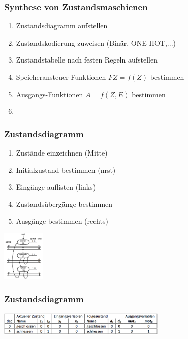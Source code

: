 \subsubsection{Synthese von Zustandsmaschienen}
	\begin{multicols}{2}
		\begin{enumerate}
			\item Zustandsdiagramm aufstellen
			\item Zustandskodierung zuweisen (Binär, ONE-HOT,...)
			\item Zustandstabelle nach festen Regeln aufstellen
			\item Speicheransteuer-Funktionen $FZ =f(Z)$ bestimmen
			\item Ausgangs-Funktionen $A=f(Z,E)$ bestimmen
			\item []
		\end{enumerate}
	\end{multicols}

\subsubsection{Zustandsdiagramm}
	\begin{multicols}{3}
		\begin{enumerate}
			\item Zustände einzeichnen (Mitte)
			\item Initialzustand bestimmen (nrst)
			\item Eingänge auflisten (links)
			\item Zustandsübergänge bestimmen 
			\item Ausgänge bestimmen (rechts)
		\end{enumerate}
		\includegraphics[width=0.15\textwidth]{pics/statediagramm}
	\end{multicols}

\subsubsection{Zustandsdiagramm}
\includegraphics[width=0.6\textwidth]{pics/statetabular}
